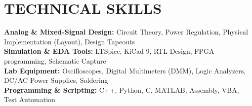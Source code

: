 \documentclass[letterpaper,11pt]{article}
\begin{document}
\section{TECHNICAL SKILLS}
 \begin{itemize}[leftmargin=0.15in, label={}]
    \small{\item{
     \textbf{Analog \& Mixed-Signal Design:} Circuit Theory, Power Regulation, Physical Implementation (Layout), Design Tapeouts \\
     \textbf{Simulation \& EDA Tools:} LTSpice, KiCad 9, RTL Design, FPGA programming, Schematic Capture \\
     \textbf{Lab Equipment:} Oscilloscopes, Digital Multimeters (DMM), Logic Analyzers, DC/AC Power Supplies, Soldering \\
     \textbf{Programming \& Scripting:} C++, Python, C, MATLAB, Assembly, VBA, Test Automation
    }}
 \end{itemize}


\end{document}
